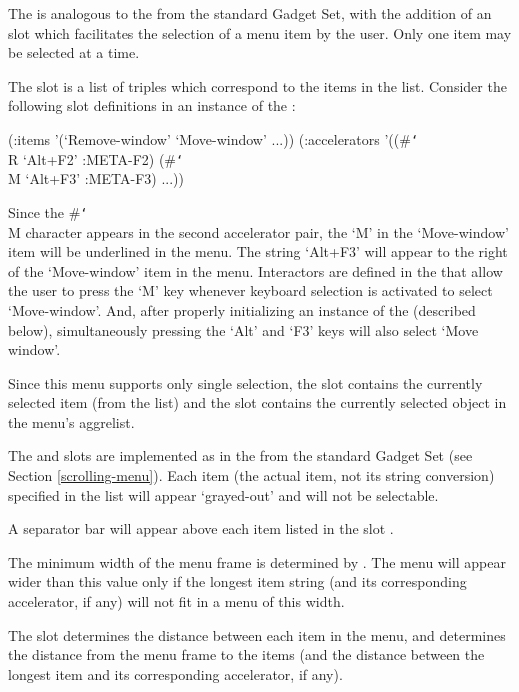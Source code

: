 The  is analogous to the  from the standard Gadget
Set, with the addition of an  slot which facilitates the
selection of a menu item by the user.  Only one item may be selected at a
time.

The  slot is a list of triples which correspond to the items
in the  list.  Consider the following slot definitions in
an instance of the :
\begin{programexample}
(:items '(`Remove-window' `Move-window' ...))
(:accelerators '((\#{\tt\char`\\}R `Alt+F2' :META-F2) (\#{\tt\char`\\}M `Alt+F3' :META-F3) ...))
\end{programexample}
Since the \#{\tt\char`\\}M character appears in the second accelerator pair, the `M' in the
`Move-window' item will be underlined in the menu.  The string `Alt+F3' will
appear to the right of the `Move-window' item in the menu.  Interactors
are defined in the  that allow the user to press the `M' key
whenever keyboard selection is activated to select `Move-window'.  And, after
properly initializing an instance of the 
(described below), simultaneously pressing the `Alt' and `F3' keys will also
select `Move window'.

Since this menu supports only single selection, the  slot contains
the currently selected item (from the  list) and the 
slot contains the currently selected object in the menu's aggrelist.

The  and  slots are implemented
as in the  from the standard Gadget Set (see Section
\ref{scrolling-menu}).  Each item (the actual item, not its string conversion)
specified in the  list will appear `grayed-out' and will
not be selectable.

A separator bar will appear above each item listed in the slot
.

The minimum width of the menu frame is determined by .
The menu will appear wider than this value only if the longest item string
(and its corresponding accelerator, if any) will not fit in a menu of this
width.

The  slot determines the distance between each item in the menu,
and  determines the distance from the menu frame to the
items (and the distance between the longest item and its corresponding
accelerator, if any).


